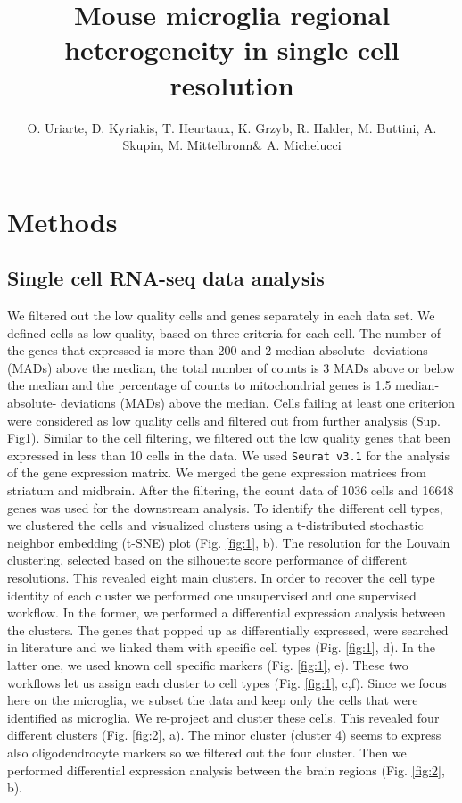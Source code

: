 \documentclass[]{article}
\title{Mouse microglia regional heterogeneity in single cell resolution}
\author{O. Uriarte, D. Kyriakis, T. Heurtaux, K. Grzyb, R. Halder, M. Buttini, A. Skupin, M. Mittelbronn& A. Michelucci}
\begin{document}
\maketitle

\begin{abstract}

\end{abstract}

\section{Methods}
\subsection{Single cell RNA-seq data analysis}
We filtered out the low quality cells and genes separately in each data set. We defined cells as low-quality, based on three criteria for each cell.  The number of the genes that expressed is more than 200 and 2 median-absolute- deviations (MADs) above the median, the total number of counts is 3 MADs above or below the median and the percentage of counts to mitochondrial genes is 1.5 median-absolute- deviations (MADs) above the median. Cells failing at least one criterion were considered as low quality cells and filtered out from further analysis (Sup. Fig1). Similar to the cell filtering, we filtered out the low quality genes that been expressed in less than 10 cells in the data.\newline
We used \texttt{Seurat v3.1} for the analysis of the gene expression matrix. We merged the gene expression matrices from striatum and midbrain. After the filtering, the count data of 1036 cells and 16648 genes was used for the downstream analysis. To identify the different cell types, we clustered the cells and visualized clusters using a t-distributed stochastic neighbor embedding (t-SNE) plot (Fig. \ref{fig:1}, b). The resolution for the Louvain clustering, selected based on the silhouette score performance of different resolutions. This revealed eight main clusters.\newline
In order to recover the cell type identity of each cluster we performed one unsupervised and one supervised workflow.  In the former, we performed a differential expression analysis between the clusters. The genes that popped up as differentially expressed, were searched in literature and we linked them with specific cell types (Fig. \ref{fig:1}, d). In the latter one, we used known cell specific markers (Fig. \ref{fig:1}, e).  These two workflows let us assign each cluster to cell types (Fig. \ref{fig:1}, c,f). 
Since we focus here on the microglia, we subset the data and keep only the cells that were identified as microglia. We re-project and cluster these cells. This revealed four different clusters (Fig. \ref{fig:2}, a). The minor cluster (cluster 4) seems to express also oligodendrocyte markers so we filtered out the four cluster. Then we performed differential expression analysis between the brain regions (Fig. \ref{fig:2}, b).
\end{document}

